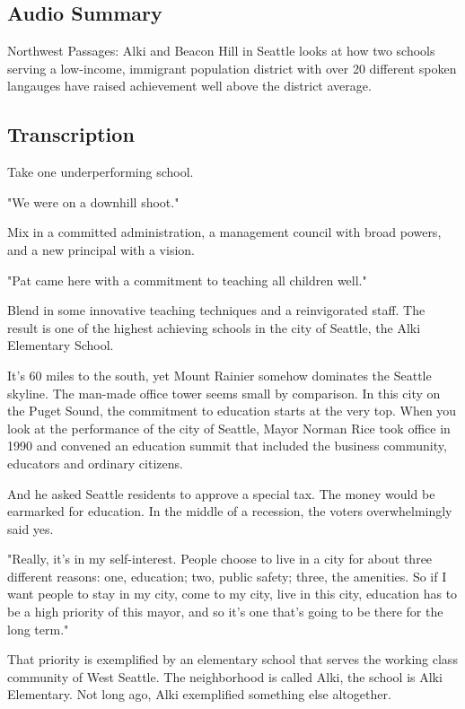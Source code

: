 \subsection{Audio Summary}

Northwest Passages: Alki and Beacon Hill in Seattle looks at how two schools serving a low-income, immigrant population district with over 20 different spoken langauges have raised achievement well above the district average.

\subsection{Transcription}

Take one underperforming school.

"We were on a downhill shoot."

Mix in a committed administration, a management council with broad powers, and a new principal with a vision.

"Pat came here with a commitment to teaching all children well."

Blend in some innovative teaching techniques and a reinvigorated staff. The result is one of the highest achieving schools in the city of Seattle, the Alki Elementary School.

It's 60 miles to the south, yet Mount Rainier somehow dominates the Seattle skyline. The man-made office tower seems small by comparison. In this city on the Puget Sound, the commitment to education starts at the very top. When you look at the performance of the city of Seattle, Mayor Norman Rice took office in 1990 and convened an education summit that included the business community, educators and ordinary citizens.

And he asked Seattle residents to approve a special tax. The money would be earmarked for education. In the middle of a recession, the voters overwhelmingly said yes.

"Really, it's in my self-interest. People choose to live in a city for about three different reasons: one, education; two, public safety; three, the amenities. So if I want people to stay in my city, come to my city, live in this city, education has to be a high priority of this mayor, and so it's one that's going to be there for the long term."

That priority is exemplified by an elementary school that serves the working class community of West Seattle. The neighborhood is called Alki, the school is Alki Elementary. Not long ago, Alki exemplified something else altogether.

